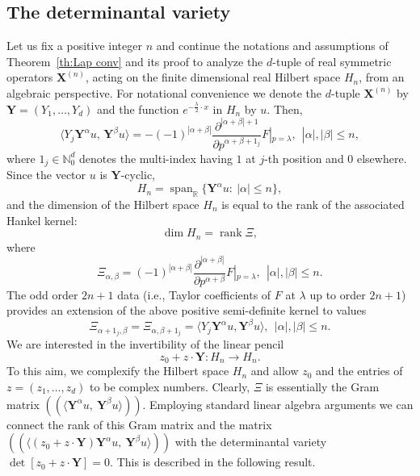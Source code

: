 \documentclass[11pt,reqno]{amsart}
\theoremstyle{plain}
\theoremstyle{definition}
\numberwithin{equation}{section}
\begin{document}
    \subsection{The determinantal variety} 
    Let us fix a positive integer $n$ and continue the notations and assumptions of Theorem~\ref{th:Lap conv} and its proof to analyze the $d$-tuple of real symmetric operators $\boldsymbol{X}^{(n)}$, acting on the finite dimensional real Hilbert space $H_n$, from an algebraic perspective.
    For notational convenience we denote the $d$-tuple $\boldsymbol{X}^{(n)}$ by $\boldsymbol{Y}= (Y_1, \ldots, Y_d)$ and the function $e^{- \frac{\lambda}{2} \cdot x}$ in $H_n$ by $u$. Then,
$$ \langle Y_j \boldsymbol{Y}^\alpha u, \, \boldsymbol{Y}^\beta u \rangle = - (-1)^{|\alpha + \beta|} \frac{\partial^{|\alpha + \beta| + 1}}{\partial p^{\alpha + \beta + 1_j}}F|_{p=\lambda}, \ \ |\alpha|, |\beta| \leq n,$$
where $1_j \in \mathbb{N}_0^d$ denotes the multi-index having $1$ at $j$-th position and $0$ elsewhere.
Since the vector $u$ is $\boldsymbol{Y}$-cyclic,
$$ H_n = \operatorname{span}_\mathbb{R} \{ \boldsymbol{Y}^\alpha u :  \ |\alpha| \leq n\}, $$
and the dimension of the Hilbert space $H_n$ is equal to the rank of the associated Hankel kernel:
$$ \dim H_n = \operatorname{rank}  \Xi,$$
where 
$$ \Xi_{\alpha, \beta} = (-1)^{|\alpha + \beta|} \frac{\partial^{|\alpha + \beta|}}{\partial p^{\alpha + \beta}}F|_{p=\lambda}, \ \ |\alpha|, |\beta| \leq n.$$
The odd order $2n+1$ data (i.e., Taylor coefficients of $F$ at $\lambda$ up to order $2n+1$) provides an extension of the above positive semi-definite kernel to values 
\begin{equation}\label{split-kernel}
 \Xi_{\alpha + 1_j, \beta} =  \Xi_{\alpha, \beta+ 1_j} = \langle Y_j \boldsymbol{Y}^\alpha u, \boldsymbol{Y}^\beta u \rangle, \ \ |\alpha|, |\beta| \leq n.
 \end{equation}
 We are interested in the invertibility of the linear pencil 
$$z_0 + z\cdot \boldsymbol{Y} : H_n \longrightarrow H_n.$$ To this aim, we complexify the Hilbert space $H_n$ and allow $z_0$ and the entries of 
$z = (z_1, \ldots, z_d)$ to be complex numbers. Clearly, $\Xi$ is essentially the Gram matrix $((\langle \boldsymbol{Y}^\alpha u, \ \boldsymbol{Y}^\beta u \rangle))$. Employing standard linear algebra arguments we can connect the rank of this Gram matrix and the matrix $((\langle  (z_0 + z\cdot \boldsymbol{Y}) \boldsymbol{Y}^\alpha u, \ \boldsymbol{Y}^\beta u \rangle))$ with the determinantal variety $\det [ z_0 + z\cdot \boldsymbol{Y} ] = 0$. This is described in the following result.
\end{document}
